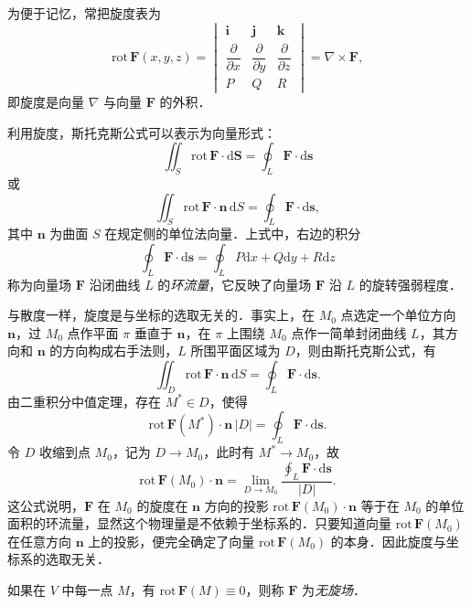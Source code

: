 为便于记忆，常把旋度表为
\[
\mathrm{rot}\,\bm{F}(x,y,z)=\begin{vmatrix}\bm{i}&\bm{j}&\bm{k}\\[3pt]\dfrac{\partial}{\partial x}&\dfrac{\partial}{\partial y}&\dfrac{\partial}{\partial z}\\[3pt] P&Q&R\end{vmatrix}=\nabla\times\bm{F},
\]
即旋度是向量 $\nabla$ 与向量 $\bm{F}$ 的外积．

利用旋度，斯托克斯公式可以表示为向量形式：
\[
\iint_{S}\mathrm{rot}\,\bm{F}\cdot\mathrm{d}\bm{S}=\oint_{L}\bm{F}\cdot\mathrm{d}\bm{s}
\]
或
\[
\iint_{S}\mathrm{rot}\,\bm{F}\cdot\bm{n}\,\mathrm{d}S=\oint_{L}\bm{F}\cdot\mathrm{d}\bm{s},
\]
其中 $\bm{n}$ 为曲面 $S$ 在规定侧的单位法向量．上式中，右边的积分
\[
\oint_{L}\bm{F}\cdot\mathrm{d}\bm{s}=\oint_{L}P\mathrm{d}x+Q\mathrm{d}y+R\mathrm{d}z
\]
称为向量场 $\bm{F}$ 沿闭曲线 $L$ 的\emph{环流量}，它反映了向量场 $\bm{F}$ 沿 $L$ 的旋转强弱程度．

与散度一样，旋度是与坐标的选取无关的．事实上，在 $M_{0}$ 点选定一个单位方向 $\bm{n}$，过 $M_{0}$ 点作平面 $\pi$ 垂直于 $\bm{n}$，在 $\pi$ 上围绕 $M_{0}$ 点作一简单封闭曲线 $L$，其方向和 $\bm{n}$ 的方向构成右手法则，$L$ 所围平面区域为 $D$，则由斯托克斯公式，有
\[
\iint_{D}\mathrm{rot}\,\bm{F}\cdot\bm{n}\,\mathrm{d}S=\oint_{L}\bm{F}\cdot\mathrm{d}\bm{s}.
\]
由二重积分中值定理，存在 $M^{*}\in D$，使得
\[
\mathrm{rot}\,\bm{F}(M^{*})\cdot\bm{n}\,|D|=\oint_{L}\bm{F}\cdot\mathrm{d}\bm{s}.
\]
令 $D$ 收缩到点 $M_{0}$，记为 $D\to M_{0}$，此时有 $M^{*}\to M_{0}$，故
\[
\mathrm{rot}\,\bm{F}(M_{0})\cdot\bm{n}=\lim_{D\to M_{0}}\frac{\displaystyle\oint_{L}\bm{F}\cdot\mathrm{d}\bm{s}}{|D|}.
\]
这公式说明，$\bm{F}$ 在 $M_{0}$ 的旋度在 $\bm{n}$ 方向的投影 $\mathrm{rot}\,\bm{F}(M_{0})\cdot\bm{n}$ 等于在 $M_{0}$ 的单位面积的环流量，显然这个物理量是不依赖于坐标系的．只要知道向量 $\mathrm{rot}\,\bm{F}(M_{0})$ 在任意方向 $\bm{n}$ 上的投影，便完全确定了向量 $\mathrm{rot}\,\bm{F}(M_{0})$ 的本身．因此旋度与坐标系的选取无关．

如果在 $V$ 中每一点 $M$，有 $\mathrm{rot}\,\bm{F}(M)\equiv 0$，则称 $\bm{F}$ 为\emph{无旋场}．

